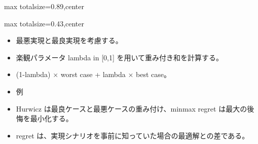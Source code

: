 \begin{minipage}[t]{0.58\textwidth}
\begin{adjustbox}{max totalsize={\textwidth}{0.89\textheight},center}
\begin{minipage}{\textwidth}
\end{minipage}
\end{adjustbox}
\end{minipage}


\clearpage
{}
\begin{minipage}[t]{0.405\textwidth}
\begin{adjustbox}{max totalsize={\textwidth}{0.43\textheight},center}
\begin{minipage}{\textwidth}\scriptsize
{}\begin{itemize}
\item 最悪実現と最良実現を考慮する。
\item 楽観パラメータ lambda in [0,1] を用いて重み付き和を計算する。
\item (1-lambda) × worst case + lambda × best case。
\item 例
\end{itemize}\begin{itemize}
\item Hurwicz は最良ケースと最悪ケースの重み付け、minmax regret は最大の後悔を最小化する。
\item regret は、実現シナリオを事前に知っていた場合の最適解との差である。
\end{itemize}
\end{minipage}
\end{adjustbox}
\end{minipage}\hfill
